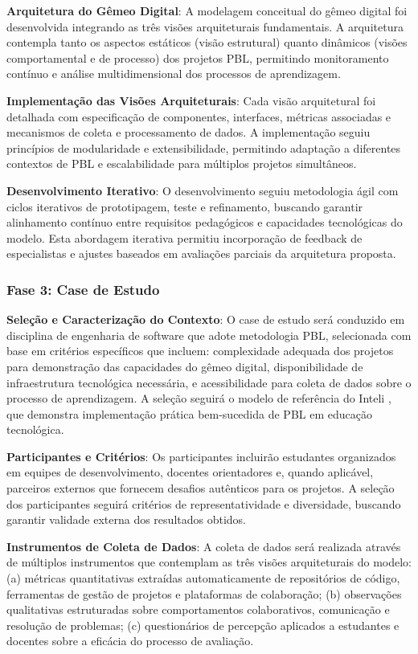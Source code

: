 \documentclass[12pt,a4paper]{article}
\renewcommand{\cite}[1]{}
\begin{document}
\textbf{Arquitetura do Gêmeo Digital}: A modelagem conceitual do gêmeo digital foi desenvolvida integrando as três visões arquiteturais fundamentais. A arquitetura contempla tanto os aspectos estáticos (visão estrutural) quanto dinâmicos (visões comportamental e de processo) dos projetos PBL, permitindo monitoramento contínuo e análise multidimensional dos processos de aprendizagem.

\textbf{Implementação das Visões Arquiteturais}: Cada visão arquitetural foi detalhada com especificação de componentes, interfaces, métricas associadas e mecanismos de coleta e processamento de dados. A implementação seguiu princípios de modularidade e extensibilidade, permitindo adaptação a diferentes contextos de PBL e escalabilidade para múltiplos projetos simultâneos.

\textbf{Desenvolvimento Iterativo}: O desenvolvimento seguiu metodologia ágil com ciclos iterativos de prototipagem, teste e refinamento, buscando garantir alinhamento contínuo entre requisitos pedagógicos e capacidades tecnológicas do modelo. Esta abordagem iterativa permitiu incorporação de feedback de especialistas e ajustes baseados em avaliações parciais da arquitetura proposta.

\subsubsection{Fase 3: Case de Estudo}

\textbf{Seleção e Caracterização do Contexto}: O case de estudo será conduzido em disciplina de engenharia de software que adote metodologia PBL, selecionada com base em critérios específicos que incluem: complexidade adequada dos projetos para demonstração das capacidades do gêmeo digital, disponibilidade de infraestrutura tecnológica necessária, e acessibilidade para coleta de dados sobre o processo de aprendizagem. A seleção seguirá o modelo de referência do Inteli \cite{inteli2024}, que demonstra implementação prática bem-sucedida de PBL em educação tecnológica.

\textbf{Participantes e Critérios}: Os participantes incluirão estudantes organizados em equipes de desenvolvimento, docentes orientadores e, quando aplicável, parceiros externos que fornecem desafios autênticos para os projetos. A seleção dos participantes seguirá critérios de representatividade e diversidade, buscando garantir validade externa dos resultados obtidos.

\textbf{Instrumentos de Coleta de Dados}: A coleta de dados será realizada através de múltiplos instrumentos que contemplam as três visões arquiteturais do modelo: (a) métricas quantitativas extraídas automaticamente de repositórios de código, ferramentas de gestão de projetos e plataformas de colaboração; (b) observações qualitativas estruturadas sobre comportamentos colaborativos, comunicação e resolução de problemas; (c) questionários de percepção aplicados a estudantes e docentes sobre a eficácia do processo de avaliação.
\end{document}
